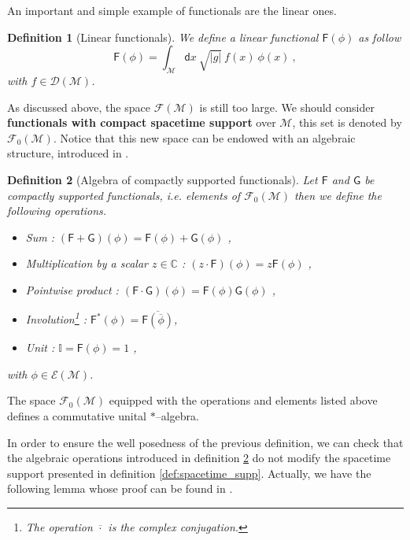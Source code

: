 \documentclass[11pt]{book}
\newcommand{\abs}[1]{\left|#1\right|}
\newcommand{\Dcal}{\mathcal{D}}
\newcommand{\Ecal}{\mathcal{E}}
\newcommand{\Fcal}{\mathcal{F}}
\newcommand{\Mcal}{\mathcal{M}}
\newcommand{\Cbb}{\mathbb{C}}
\newcommand{\Ibb}{\mathbb{I}}
\newcommand{\Fsf}{\mathsf{F}}
\newcommand{\Gsf}{\mathsf{G}}
\newcommand{\dsf}{\mathsf{d}}
\theoremstyle{break}
\newtheorem{definition}{Definition}[chapter]
\begin{document}
An important and simple example of functionals are the linear ones. 


\begin{definition}[Linear functionals]\label{def:linear_obs}
We define a linear functional $\Fsf(\phi)$ as follow
%
\begin{equation*}
\Fsf(\phi) = \int_\Mcal \dsf x \ \sqrt{\abs{g}} \ f(x) \ \phi(x) \ , 
\end{equation*}
%
with $f \in \Dcal(\Mcal)$.
\end{definition}



As discussed above, the space $\Fcal(\Mcal)$ is still too large. We should consider \textbf{functionals with compact spacetime support} over $\Mcal$, this set is denoted by $\Fcal_0(\Mcal)$. Notice that this new space can be endowed with an algebraic structure, introduced in \cite{BFLR_2012}.


\begin{definition}[Algebra of compactly supported functionals] \label{def:algebra_comp_supp_func}
Let $\Fsf$ and $\Gsf$ be compactly supported functionals, i.e. elements of $\Fcal_0(\Mcal)$ then we define the following operations.
%
\begin{itemize}
\item Sum : $(\Fsf+\Gsf)(\phi) = \Fsf(\phi) + \Gsf(\phi)$ ,
\item Multiplication by a scalar $z\in\Cbb$ : $(z \cdot \Fsf)(\phi) = z \Fsf(\phi)$ ,
\item Pointwise product : $(\Fsf \cdot \Gsf)(\phi) = \Fsf(\phi) \Gsf(\phi)$ ,
\item Involution\footnote{The operation $\overline{\cdot}$ is the complex conjugation.} : $\Fsf^\ast(\phi) = \overline{\Fsf(\overline{\phi})}$,
\item Unit : $\Ibb = \Fsf(\phi) = 1$ ,
\end{itemize}
%
with $\phi \in \Ecal(\Mcal)$. 
\end{definition}


The space $\Fcal_0(\Mcal)$ equipped with the operations and elements listed above defines a commutative unital $\ast$--algebra.


In order to ensure the well posedness of the previous definition, we can check that the algebraic operations introduced in definition \ref{def:algebra_comp_supp_func} do not modify the spacetime support presented in definition \ref{def:spacetime_supp}. Actually, we have the following lemma whose proof can be found in  \cite{BFLR_2012}.
\end{document}
